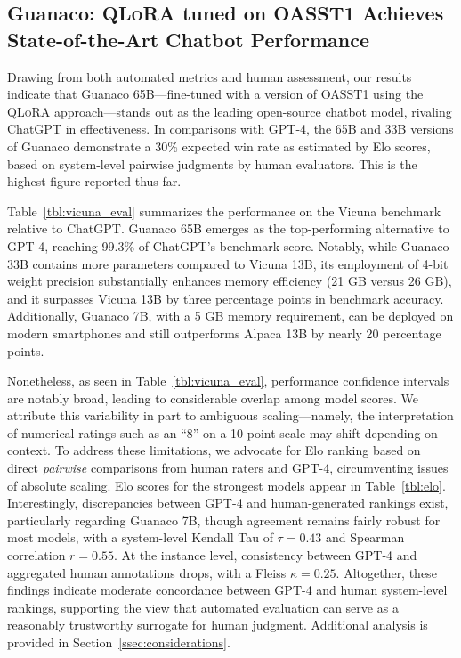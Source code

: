\subsection{\textbf{Guanaco}: \textsc{QLoRA} tuned on OASST1 Achieves State-of-the-Art Chatbot Performance}

Drawing from both automated metrics and human assessment, our results indicate that {Guanaco} 65B—fine-tuned with a version of OASST1 using the \textsc{QLoRA} approach—stands out as the leading open-source chatbot model, rivaling ChatGPT in effectiveness. In comparisons with GPT-4, the 65B and 33B versions of {Guanaco} demonstrate a 30\% expected win rate as estimated by Elo scores, based on system-level pairwise judgments by human evaluators. This is the highest figure reported thus far.

Table~\ref{tbl:vicuna_eval} summarizes the performance on the Vicuna benchmark \cite{vicuna2023} relative to ChatGPT. {Guanaco} 65B emerges as the top-performing alternative to GPT-4, reaching 99.3\% of ChatGPT's benchmark score. Notably, while {Guanaco} 33B contains more parameters compared to Vicuna 13B, its employment of 4-bit weight precision substantially enhances memory efficiency (21 GB versus 26 GB), and it surpasses Vicuna 13B by three percentage points in benchmark accuracy. Additionally, {Guanaco} 7B, with a 5 GB memory requirement, can be deployed on modern smartphones and still outperforms Alpaca 13B by nearly 20 percentage points.

Nonetheless, as seen in Table~\ref{tbl:vicuna_eval}, performance confidence intervals are notably broad, leading to considerable overlap among model scores. We attribute this variability in part to ambiguous scaling—namely, the interpretation of numerical ratings such as an “8” on a 10-point scale may shift depending on context. To address these limitations, we advocate for Elo ranking \citep{elo1967proposed} based on direct \textit{pairwise} comparisons from human raters and GPT-4, circumventing issues of absolute scaling. Elo scores for the strongest models appear in Table~\ref{tbl:elo}. Interestingly, discrepancies between GPT-4 and human-generated rankings exist, particularly regarding Guanaco 7B, though agreement remains fairly robust for most models, with a system-level Kendall Tau of $\tau=0.43$ and Spearman correlation $r=0.55$. At the instance level, consistency between GPT-4 and aggregated human annotations drops, with a Fleiss $\kappa=0.25$. Altogether, these findings indicate moderate concordance between GPT-4 and human system-level rankings, supporting the view that automated evaluation can serve as a reasonably trustworthy surrogate for human judgment. Additional analysis is provided in Section~\ref{ssec:considerations}.

